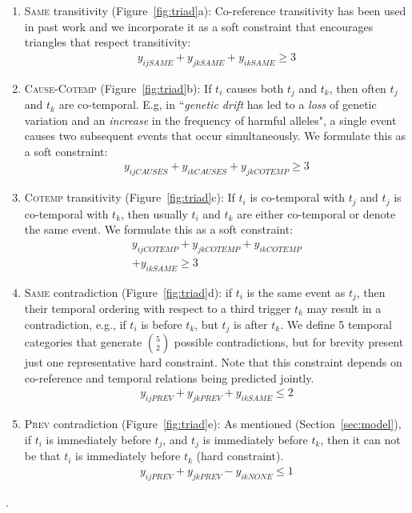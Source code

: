 \begin{enumerate}[itemsep=0pt,topsep=0pt] 
\item \textsc{Same} transitivity (Figure~\ref{fig:triad}a): Co-reference transitivity has been used in past work \cite{Finkel08} and we incorporate it as a soft constraint that encourages triangles that respect transitivity: 
\begin{align}
y_{ijSAME} + y_{jkSAME} + y_{ikSAME} \geq 3 \label{eq:sametransitivity}
\end{align}

\item \textsc{Cause}-\textsc{Cotemp} (Figure~\ref{fig:triad}b): If $t_i$ causes both $t_j$ and $t_k$, then often $t_j$ and $t_k$ are co-temporal. E.g, in ``\emph{genetic drift} has led to a \emph{loss} of genetic variation and an \emph{increase} in the frequency of harmful alleles", a single event causes two subsequent events that occur simultaneously. We formulate this as a soft constraint:
\begin{align}
y_{ijCAUSES} + y_{ikCAUSES} + y_{jkCOTEMP} \geq 3 \label{eq:causecotemp}
\end{align}

\item \textsc{Cotemp} transitivity (Figure~\ref{fig:triad}c):  If $t_i$ is co-temporal with $t_j$ and $t_j$ is co-temporal with $t_k$, then usually $t_i$ and $t_k$ are either co-temporal or denote the same event. We formulate this as a soft constraint:
\begin{multline}
y_{ijCOTEMP} + y_{jkCOTEMP}  +y_{ikCOTEMP} \\ + y_{ikSAME} \geq 3 \label{eq:cotemptransitivity}
\end{multline}

\item \textsc{Same} contradiction (Figure~\ref{fig:triad}d): if $t_i$ is the same event as  $t_j$, then their temporal ordering with respect to a third trigger $t_k$ may result in a contradiction, e.g., if $t_i$ is before $t_k$, but $t_j$ is after $t_k$. We define 5 temporal categories that generate $5 \choose 2$ possible contradictions, but for brevity present just one representative hard constraint. Note that this constraint depends on co-reference and temporal relations being predicted jointly.
\begin{align}
y_{ijPREV} + y_{jkPREV} + y_{ikSAME} \leq 2 \label{eq:samecontradiction}
\end{align}
\item \textsc{Prev} contradiction (Figure~\ref{fig:triad}e): As mentioned (Section~\ref{sec:model}), if $t_i$ is immediately before $t_j$, and $t_j$ is immediately before $t_k$, then it can not be that $t_i$ is immediately before $t_k$ (hard constraint).
\begin{align} 
y_{ijPREV} + y_{jkPREV} - y_{ikNONE} \leq 1 \label{eq:prev}
\end{align}
\end{enumerate}.

